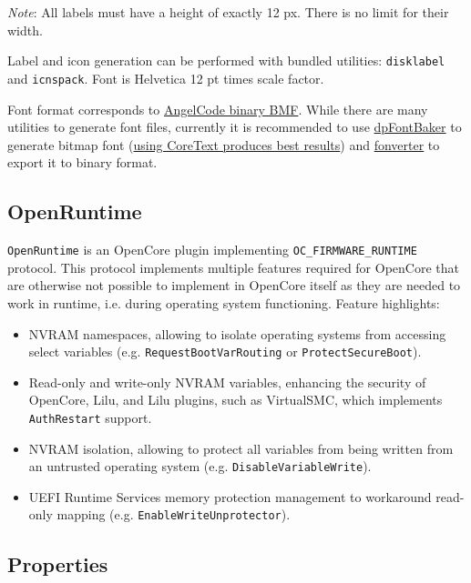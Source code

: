 \documentclass[]{article}
\makeatletter
\renewcommand{\label}[1]{%
\zref@wrapper@immediate{\oldlabel{#1}}}  %
\makeatother
\begin{document}
\emph{Note}: All labels must have a height of exactly 12 px. There is no limit for their width.

Label and icon generation can be performed with bundled utilities: \texttt{disklabel} and
\texttt{icnspack}. Font is Helvetica 12 pt times scale factor.

Font format corresponds to \href{https://www.angelcode.com/products/bmfont}{AngelCode binary BMF}.
While there are many utilities to generate font files, currently it is recommended to use
\href{https://github.com/danpla/dpfontbaker}{dpFontBaker} to generate bitmap font
(\href{https://github.com/danpla/dpfontbaker/pull/1}{using CoreText produces best results})
and \href{https://github.com/usr-sse2/fonverter}{fonverter} to export it to binary format.

\subsection{OpenRuntime}\label{uefiruntime}

\texttt{OpenRuntime} is an OpenCore plugin implementing \texttt{OC\_FIRMWARE\_RUNTIME} protocol.
This protocol implements multiple features required for OpenCore that are otherwise not possible
to implement in OpenCore itself as they are needed to work in runtime, i.e. during operating system
functioning. Feature highlights:

\begin{itemize}
  \item NVRAM namespaces, allowing to isolate operating systems from accessing select
  variables (e.g. \texttt{RequestBootVarRouting} or \texttt{ProtectSecureBoot}).
  \item Read-only and write-only NVRAM variables, enhancing the security of OpenCore,
  Lilu, and Lilu plugins, such as VirtualSMC, which implements \texttt{AuthRestart} support.
  \item NVRAM isolation, allowing to protect all variables from being written from
  an untrusted operating system (e.g. \texttt{DisableVariableWrite}).
  \item UEFI Runtime Services memory protection management to workaround read-only
  mapping (e.g. \texttt{EnableWriteUnprotector}).
\end{itemize}

\subsection{Properties}\label{uefiprops}
\end{document}
